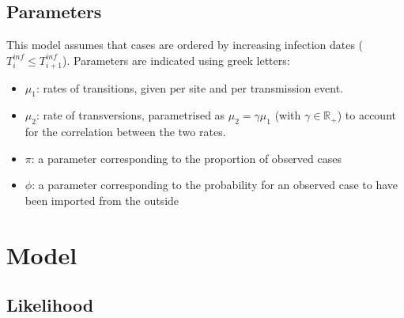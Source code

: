 \documentclass[10pt]{article}
\begin{document}
\subsection*{Parameters}
This model assumes that cases are ordered by increasing infection dates ($T_i^{inf} \leq T_{i+1}^{inf}$).
Parameters are indicated using greek letters:
\begin{itemize}
	\item $\mu_1$: rates of transitions, given per site and per transmission event.
	\item $\mu_2 $: rate of transversions, parametrised as $\mu_2 = \gamma \mu_1$ (with $\gamma \in \mathbb{R}_+$) to account for the correlation between the two rates.
	\item $\pi$: a parameter corresponding to the proportion of observed cases
	\item $\phi$: a parameter corresponding to the probability for an observed case to have been imported from the outside
\end{itemize}






\section*{Model}

\subsection*{Likelihood}
\end{document}
